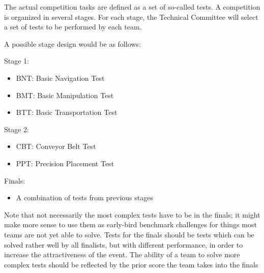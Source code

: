 The actual competition tasks are defined as a set of so-called tests. A competition is organized in several stages. For each stage, the Technical Committee will select a set of tests to be performed by each team.
\par
A possible stage design would be as follows:

Stage 1:
\begin{itemize}
	\item BNT: Basic Navigation Test
	\item BMT: Basic Manipulation Test
	\item BTT: Basic Transportation Test
\end{itemize}


Stage 2:
\begin{itemize}
	\item CBT: Conveyor Belt Test
	\item PPT: Precision Placement Test
\end{itemize}

Finals: 
\begin{itemize}
	\item A combination of tests from previous stages
\end{itemize}

Note that not necessarily the most complex tests have to be in the finals; it might make more sense to use them as early-bird benchmark challenges for things most teams are not yet able to solve. Tests for the finals should be tests which can be solved rather well by all finalists, but with different performance, in order to increase the attractiveness of the event. The ability of a team to solve more complex tests should be reflected by the prior score the team takes into the finals